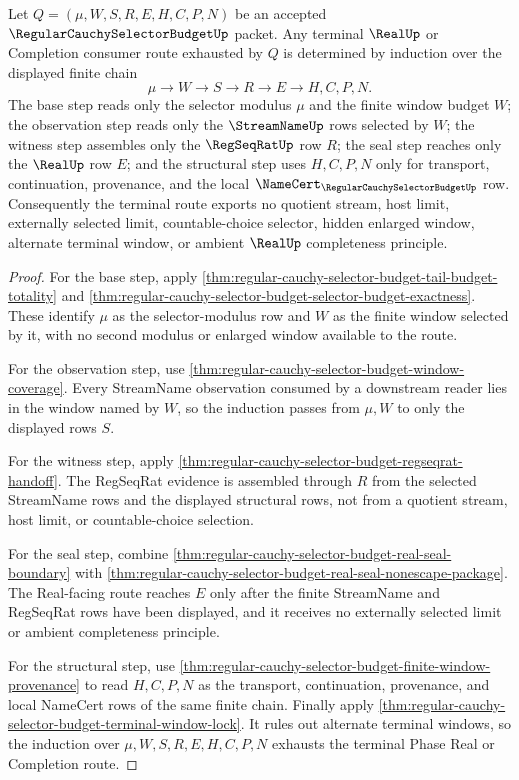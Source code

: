 \begin{theorem}
\label{thm:regular-cauchy-selector-budget-finite-chain-induction}
Let $Q=(\mu,W,S,R,E,H,C,P,N)$ be an accepted $\RegularCauchySelectorBudgetUp$ packet. Any terminal $\RealUp$ or Completion consumer route exhausted by $Q$ is determined by induction over the displayed finite chain
$$
\mu \longrightarrow W \longrightarrow S \longrightarrow R \longrightarrow E \longrightarrow H,C,P,N.
$$
The base step reads only the selector modulus $\mu$ and the finite window budget $W$; the observation step reads only the $\StreamNameUp$ rows selected by $W$; the witness step assembles only the $\RegSeqRatUp$ row $R$; the seal step reaches only the $\RealUp$ row $E$; and the structural step uses $H,C,P,N$ only for transport, continuation, provenance, and the local $\NameCert_{\RegularCauchySelectorBudgetUp}$ row. Consequently the terminal route exports no quotient stream, host limit, externally selected limit, countable-choice selector, hidden enlarged window, alternate terminal window, or ambient $\RealUp$ completeness principle.
\end{theorem}
\begin{proof}
For the base step, apply \autoref{thm:regular-cauchy-selector-budget-tail-budget-totality} and \autoref{thm:regular-cauchy-selector-budget-selector-budget-exactness}. These identify $\mu$ as the selector-modulus row and $W$ as the finite window selected by it, with no second modulus or enlarged window available to the route.

For the observation step, use \autoref{thm:regular-cauchy-selector-budget-window-coverage}. Every StreamName observation consumed by a downstream reader lies in the window named by $W$, so the induction passes from $\mu,W$ to only the displayed rows $S$.

For the witness step, apply \autoref{thm:regular-cauchy-selector-budget-regseqrat-handoff}. The RegSeqRat evidence is assembled through $R$ from the selected StreamName rows and the displayed structural rows, not from a quotient stream, host limit, or countable-choice selection.

For the seal step, combine \autoref{thm:regular-cauchy-selector-budget-real-seal-boundary} with \autoref{thm:regular-cauchy-selector-budget-real-seal-nonescape-package}. The Real-facing route reaches $E$ only after the finite StreamName and RegSeqRat rows have been displayed, and it receives no externally selected limit or ambient completeness principle.

For the structural step, use \autoref{thm:regular-cauchy-selector-budget-finite-window-provenance} to read $H,C,P,N$ as the transport, continuation, provenance, and local NameCert rows of the same finite chain. Finally apply \autoref{thm:regular-cauchy-selector-budget-terminal-window-lock}. It rules out alternate terminal windows, so the induction over $\mu,W,S,R,E,H,C,P,N$ exhausts the terminal Phase Real or Completion route.
\end{proof}

